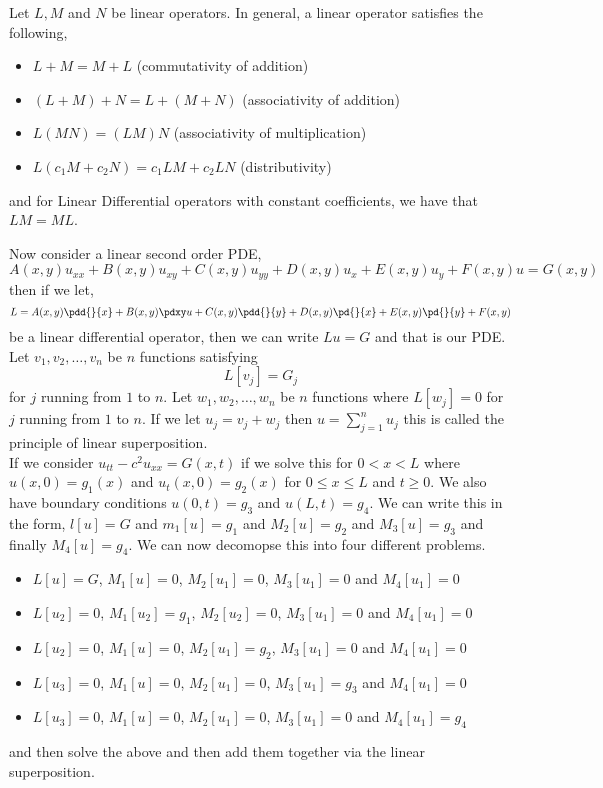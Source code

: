 \begin{nlemma}
  Let $L, M$ and $N$ be linear operators. In general, a linear operator satisfies the following,
  \begin{itemize}
    \item $L + M = M + L$ (commutativity of addition)
    \item $(L + M) + N = L + (M + N)$ (associativity of addition)
    \item $L(MN) = (LM)N$ (associativity of multiplication)
    \item $L(c_1M + c_2N) = c_1LM + c_2LN$ (distributivity)
  \end{itemize}
  and for Linear Differential operators with constant coefficients, we have that $LM = ML$.
\end{nlemma}

Now consider a linear second order PDE,
$$A(x, y)u_{xx} + B(x, y)u_{xy} + C(x, y)u_{yy} + D(x, y)u_x + E(x, y)u_y + F(x, y)u = G(x, y)$$
then if we let,
$$ L = A(x, y)\pdd{}{x} + B(x, y)\pdxy u + C(x, y)\pdd{}{y} + D(x, y)\pd{}{x} + E(x, y)\pd{}{y} + F(x, y) $$
be a linear differential operator, then we can write $Lu = G$ and that is our PDE.\\

\noindent
Let $v_1, v_2, \dots, v_n$ be $n$ functions satisfying
$$ L[v_j] = G_j $$
 for $j$ running from $1$ to $n$. Let $w_1, w_2, \dots, w_n$ be $n$ functions where $L[w_j] = 0$ for $j$ running from $1$ to $n$. If we let $u_j = v_j + w_j$ then $u=  \sum_{j=1}^n u_j$ this is called the principle of linear superposition.\\

\noindent
If we consider $u_{tt} - c^2u_{xx} = G(x, t)$ if we solve this for $0 < x < L$ where $u(x, 0) = g_1(x)$ and $u_t(x, 0) = g_2(x)$ for $0 \le x \le L$ and $t \ge 0$. We also have boundary conditions $u(0, t) = g_3$ and $u(L, t) = g_4$. We can write this in the form, $l[u] = G$ and $m_1[u] = g_1$ and $M_2[u] = g_2$ and $M_3[u] = g_3$ and finally $M_4[u] = g_4$. We can now decomopse this into four different problems.
\begin{itemize}
  \item $L[u] = G$, $M_1[u] = 0$, $M_2[u_1] = 0$, $M_3[u_1] = 0$ and $M_4[u_1] = 0$
  \item $L[u_2] = 0$, $M_1[u_2] = g_1$, $M_2[u_2] = 0$, $M_3[u_1] = 0$ and $M_4[u_1] = 0$
  \item $L[u_2] = 0$, $M_1[u] = 0$, $M_2[u_1] = g_2$, $M_3[u_1] = 0$ and $M_4[u_1] = 0$
  \item $L[u_3] = 0$, $M_1[u] = 0$, $M_2[u_1] = 0$, $M_3[u_1] = g_3$ and $M_4[u_1] = 0$
  \item $L[u_3] = 0$, $M_1[u] = 0$, $M_2[u_1] = 0$, $M_3[u_1] = 0$ and $M_4[u_1] = g_4$
\end{itemize}
and then solve the above and then add them together via the linear superposition.

